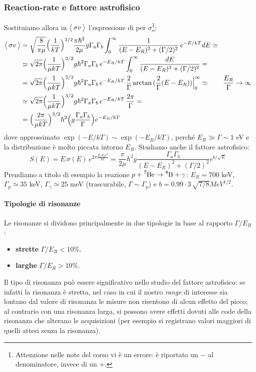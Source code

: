 \subsubsection{Reaction-rate e fattore astrofisico}
Sostituiamo allora in $\bigl\langle\, \sigma v\, \bigr\rangle$ l'espressione di \BW{} per $\sigma$\footnote{Attenzione nelle note del corso vi è un errore: è riportato un $-$ al denominatore, invece di un $+$.}:
\begin{displaymath}
\begin{aligned}
\bigl\langle\, \sigma v\, \bigr\rangle &= \sqrt{\frac{8}{\pi\mu}} \Bigl ( \frac{1}{kT} \Bigr )^{3/2} \frac{\pi\hbar^2}{2\mu} g \Gamma_a\Gamma_b \int_0^\infty \frac{1}{(E-E_R)^2 + (\Gamma/2)^2} \, e^{-E/kT} dE \simeq \\
&\simeq \sqrt{2\pi}\Bigl ( \frac{1}{\mu kT} \Bigr )^{3/2} g\hbar^2 \Gamma_a\Gamma_b\, e^{-E_R/kT} \int_0^\infty \frac{dE}{(E-E_R)^2 + (\Gamma/2)^2} =\\
&= \sqrt{2\pi}\Bigl ( \frac{1}{\mu kT} \Bigr )^{3/2} g\hbar^2 \Gamma_a\Gamma_b\, e^{-E_R/kT} \,\frac{2}{\Gamma} \arctan{(\frac{2}{\Gamma}(E-E_R))}\Bigr |_{0}^\infty \simeq \qquad \frac{E_R}{\Gamma}\to \infty \\
&\simeq \sqrt{2\pi}\Bigl ( \frac{1}{\mu kT} \Bigr )^{3/2} g\hbar^2 \Gamma_a\Gamma_b\, e^{-E_R/kT} \, \frac{2\pi}{\Gamma} = \\
&= \Bigl ( \frac{2\pi}{\mu kT} \Bigr )^{3/2} \hbar^2 \Bigl ( g\frac{\Gamma_a\Gamma_b}{\Gamma} \Bigr )e^{-E_R/kT}
\end{aligned}
\end{displaymath}
dove approssimato $\exp{(-E/kT)}\sim \exp{(-E_R/kT)}$, perché $E_R\gg \Gamma \sim 1$ eV e la distribuzione è molto piccata intorno $E_R$. Studiamo anche il fattore astrofisico:
$$S(E)=E\, \sigma(E) \, e^{2\pi\frac{Z_1Z_2e^2}{\hbar v}}= \frac{\pi}{2\mu} \hbar^2 g \frac{\Gamma_a\Gamma_b}{(E-E_R)^2+(\Gamma/2)^2}e^{b/\sqrt{E}}$$
Prendiamo a titolo di esempio la reazione $p+\ce{^7Be}\to \ce{^8B} +\gamma$: $E_R=700$ keV, $\Gamma_p \simeq 35$ keV, $\Gamma_\gamma \simeq 25$ meV (trascurabile, $\Gamma \sim \Gamma_p$) e $b=0.99\cdot 3\,\sqrt{7/8}\unit{MeV}^{1/2}$. 

\paragraph{Tipologie di risonanze} Le risonanze si dividono principalmente in due tipologie in base al rapporto $\Gamma/E_R$:
\begin{itemize}
    \item \textbf{strette} $\Gamma/E_R<10\%$.
    \item \textbf{larghe} $\Gamma/E_R>10\%$.
\end{itemize}
Il tipo di risonanza può essere significativo nello studio del fattore astrofisico: se infatti la risonanza è stretta, nel caso in cui il nostro \textit{range} di interesse sia lontano dal valore di risonanza le misure non risentono di alcun effetto del picco; al contrario con una risonanza larga, si possono avere effetti dovuti alle code della risonanza che alterano le acquisizioni (per esempio si registrano valori maggiori di quelli attesi senza la risonanza).

